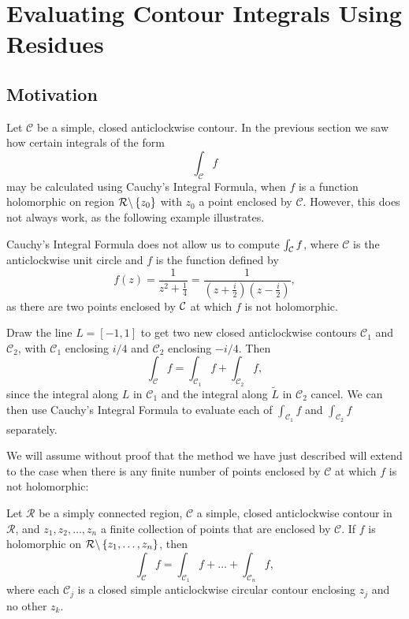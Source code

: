 \chapter[Residues]{Evaluating Contour Integrals Using Residues}
\section{Motivation}
Let $\mathcal{C}$ be a simple, closed anticlockwise contour.  In the previous section we saw how certain integrals of the form
\[
\int_{\mathcal{C}} f
\]
may be calculated using Cauchy's Integral Formula, when $f$ is a function holomorphic on region $\mathcal{R} \backslash \left\{z_0\right\}$ with $z_0$ a point enclosed by $\mathcal{C}$.  However, this does not always work, as the following example illustrates.
\begin{example}
\label{e:gdef}
Cauchy's Integral Formula does not allow us to compute $\int_{\mathcal{C}} f$, where $\mathcal{C}$ is the anticlockwise unit circle and $f$ is the function defined by
\[
f(z) = \frac{1}{z^2+\frac{1}{4}} = \frac{1}{(z+\frac{i}{2})(z-\frac{i}{2})},
\]
as there are two points enclosed by $\mathcal{C}$ at which $f$ is not holomorphic. 
\begin{blankbox}
\begin{center}
\end{center}
Draw the line $L=[-1,1]$ to get two new closed anticlockwise contours $\mathcal{C}_1$ and $\mathcal{C}_2$, with $\mathcal{C}_1$ enclosing $i/4$ and $\mathcal{C}_2$ enclosing $-i/4$.  Then
\[
\int_{\mathcal{C}} f = \int_{\mathcal{C}_1} f + \int_{\mathcal{C}_2} f,
\]
since the integral along $L$ in $\mathcal{C}_1$ and the integral along $\tilde{L}$ in $\mathcal{C}_2$ cancel.  We can then use Cauchy's Integral Formula to evaluate each of $\displaystyle \int_{\mathcal{C}_1} f$ and $\displaystyle \int_{\mathcal{C}_2} f$ separately.
\end{blankbox} 
\end{example}
We will assume without proof that the method we have just described will extend to the case when there is any finite number of points enclosed by $\mathcal{C}$ at which $f$ is not holomorphic:





\begin{theorem}
\label{t:gdef}
Let $\mathcal{R}$ be a simply connected region, $\mathcal{C}$ a simple, closed anticlockwise contour in $\mathcal{R}$, and $z_1,z_2,\ldots,z_n$ a finite collection of points that are enclosed by $\mathcal{C}$.  If $f$ is holomorphic on $\mathcal{R} \backslash \left\{z_1,\ldots,z_n\right\}$, then 
\[
\int_{\mathcal{C}} f = \int_{\mathcal{C}_1}f+ \ldots + \int_{\mathcal{C}_n} f,
\]
where each $\mathcal{C}_j$ is a closed simple anticlockwise circular contour enclosing $z_j$ and no other $z_k$.
\end{theorem}

